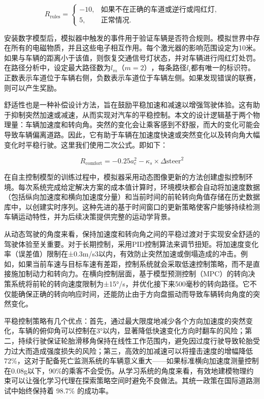 \begin{equation}
	R_{\text{rules}} = 
	\begin{cases} 
		-10, & \text{如果不在正确的车道或逆行或闯红灯}, \\ 
		5,   & \text{正常情况}. 
	\end{cases}
\end{equation}

安装数字模型后，模拟器中触发的事件用于验证车辆是否符合规则。模拟世界中存在所有的电磁物质，并且这些电子相互作用。每个激光器的影响范围设定为10米。如果与车辆的距离小于该值，则恢复交通信号灯状态，并对车辆进行闯红灯处罚。在路径分析中，设定最大路径数为\(l_m（m=2）\)，每条路径\(l_i\)都有唯一的标识符。正数表示车道位于车辆右侧，负数表示车道位于车辆左侧。如果发现错误的联赛，则可以产生奖励。

舒适性也是一种补偿设计方法，旨在鼓励平稳加速和减速以增强驾驶体验。这有助于抑制突然加速或减速，从而实现对汽车的平稳控制。本文的设计逻辑基于两个物理量：车辆加速度和转向角。突然的变化会让乘客感到不舒服，而大的变化可能会导致车辆偏离道路。因此，它有助于车辆在加速度快速或突然变化以及转向角大幅变化时平稳行驶。这里我们使用二次公式。即如下：

\begin{equation}
	R_{\text{comfort}} = -0.25 a_c^2 - \kappa_s \times \Delta \text{steer}^2
\end{equation}

在自主控制模型的训练过程中，模拟器采用动态图像更新的方法创建虚拟控制环境。每次系统完成给定解决方案的成本值计算时，环境模块都会自动将加速度数据（包括纵向加速度和横向加速度分量）和当前时间的前轮转向角值存储在历史数据库中，以创建实时序列。这种先进的基于时间窗口的更新策略使客户能够持续检测车辆运动特性，并为后续决策提供完整的运动学背景。

从动态驾驶的角度来看，保持加速度和转向角之间的平稳过渡对于实现安全舒适的驾驶体验至关重要。对于长期控制，采用PID控制算法来调节扭矩。将加速度变化率（误差值）限制在±0.3m/s3以内，有效防止突然加速或倒塌造成的冲击。例如，如果当前车速与目标车速有差距，控制系统就会采取低速控制策略，而不是直接施加制动力和转向力。在横向控制层面，基于模型预测控制（MPC）的转向决策系统将前轮的转向速度限制为±15°/s，并优化接下来500毫秒的转向路径。它不仅能确保正确的转向响应时间，还能防止由于方向盘振动而导致车辆转向角度的突然变化。

平稳控制策略有几个优点：首先，通过最大限度地减少各个方向加速度的突然变化，车辆的俯仰角可以控制在3°以内，显著降低快速变化方向时翻车的风险；第二，持续行驶保证轮胎滑移角保持在线性工作范围内，避免因过度行驶导致轮胎受力过大而造成强度损失的风险；第三，高效的加减速可以将撞击速度的增幅降低72\%，这对于配备死亡监测系统的车辆意义重大——如果标准横向加速度测量控制在0.08g以下，90\%的乘客不会受伤。从学习系统的角度来看，有效地建模物理约束可以让强化学习代理在探索策略空间时避免不良做法。其统一政策在国际道路测试中始终保持着 98.7\% 的成功率。

